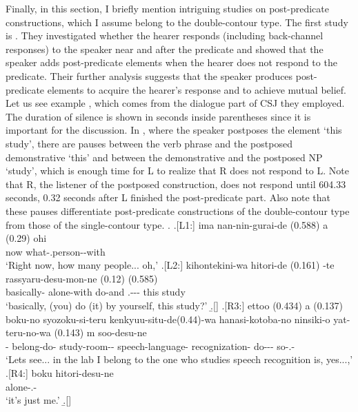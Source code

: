 Finally, in this section,
I briefly mention intriguing studies on post-predicate constructions,
which I assume belong to the double-contour type.
The first study is .
They investigated whether the hearer responds (including back-channel responses) to the speaker near and after the predicate and showed that
the speaker adds post-predicate elements
when the hearer does not respond to the predicate.
Their further analysis suggests that the speaker produces post-predicate elements to acquire the hearer's response and to achieve mutual belief.
Let us see example \Next,
which comes from the dialogue part of CSJ they employed.
The duration of silence is shown in seconds inside parentheses
since it is important for the discussion.
In \Next[-L2], where the speaker postposes the element  `this study',
there are pauses between the verb phrase and the postposed demonstrative  `this' and between the demonstrative and the postposed NP  `study',
which is enough time for L to realize that
R does not respond to L.
Note that R, the listener of the postposed construction,
does not respond until 604.33 seconds,
0.32 seconds after L finished the post-predicate part.
Also note that
these pauses differentiate post-predicate constructions of the double-contour type from those of the single-contour type.
%
\ex.
 \ag.[L1:] ima nan-nin-gurai-de (0.588) a (0.29) ohi \\
           now what-.person--with {}  {}  \\
           `Right now, how many people... oh,'
 \bg.[L2:] kihontekini-wa hitori-de (0.161) -te rassyaru-desu-mon-ne
           (0.12)  (0.585)  \\
           basically- alone-with {} do-and .--- {} this {} study \\
           `basically, (you) do (it) by yourself, this study?'
 \b.[] 
 \bg.[R3:] ettoo (0.434) a (0.137) boku-no syozoku-si-teru kenkyuu-situ-de(0.44)-wa hanasi-kotoba-no ninsiki-o yat-teru-no-wa (0.143) m soo-desu-ne \\
            {}  {} - belong-do- study-room-- speech-language- recognization- do--- {}  so-.- \\
           `Lets see... in the lab I belong to the one who studies speech recognition is, yes...,'
 \bg.[R4:] boku hitori-desu-ne \\
       alone-.- \\
      `it's just me.'
  \b.[] \hfill{\cite[287]{kakuden12}}


